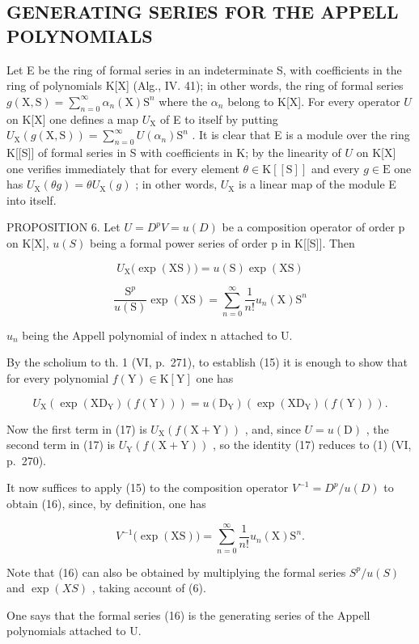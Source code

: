 \subsection{GENERATING SERIES FOR THE APPELL POLYNOMIALS}

Let E be the ring of formal series in an indeterminate S, with coefficients in the ring of polynomials K{[}X{]} (Alg., IV. 41); in other words, the ring of formal series \(g(\mathrm{X}, \mathrm{S}) = \sum_{n=0}^{\infty} \alpha_n(\mathrm{X}) \mathrm{S}^n\) where the \(\alpha_n\) belong to K{[}X{]}. For every operator \(U\) on K{[}X{]} one defines a map \(U_{\mathrm{X}}\) of E to itself by putting \(U_{\mathrm{X}}(g(\mathrm{X}, \mathrm{S})) = \sum_{n=0}^{\infty} U(\alpha_n)\mathrm{S}^n\) . It is clear that E is a module over the ring K{[}{[}S{]}{]} of formal series in S with coefficients in K; by the linearity of \(U\) on K{[}X{]} one verifies immediately that for every element \(\theta \in \mathrm{K}[[\mathrm{S}]]\) and every \(g \in \mathrm{E}\) one has \(U_{\mathrm{X}}(\theta g) = \theta U_{\mathrm{X}}(g)\) ; in other words, \(U_{\mathrm{X}}\) is a linear map of the module E into itself.

PROPOSITION 6. Let \(U = D^{p}V = u(D)\) be a composition operator of order p on K{[}X{]}, \(u(S)\) being a formal power series of order p in K{[}{[}S{]}{]}. Then

\[
U _ {\mathrm{X}} \big (\exp (\mathrm{XS}) \big) = u (\mathrm{S}) \exp (\mathrm{XS})\tag{15}
\]

\[
\frac {\mathrm{S} ^ {p}}{u (\mathrm{S})} \exp (\mathrm{XS}) = \sum_ {n = 0} ^ {\infty} \frac {1}{n !} u _ {n} (\mathrm{X}) \mathrm{S} ^ {n}\tag{16}
\]

\(u_{n}\) being the Appell polynomial of index n attached to U.

By the scholium to th. 1 (VI, p.~271), to establish (15) it is enough to show that for every polynomial \(f(\mathrm{Y}) \in \mathrm{K}[\mathrm{Y}]\) one has

\[
U _ {\mathrm{X}} \left(\exp (\mathrm{XD} _ {\mathrm{Y}}) (f (\mathrm{Y}))\right) = u (\mathrm{D} _ {\mathrm{Y}}) \left(\exp (\mathrm{XD} _ {\mathrm{Y}}) (f (\mathrm{Y}))\right).\tag{17}
\]

Now the first term in (17) is \(U_{\mathrm{X}}(f(\mathrm{X} + \mathrm{Y}))\) , and, since \(U = u(\mathrm{D})\) , the second term in (17) is \(U_{\mathrm{Y}}(f(\mathrm{X} + \mathrm{Y}))\) , so the identity (17) reduces to (1) (VI, p.~270).

It now suffices to apply (15) to the composition operator \(V^{-1} = D^{p}/u(D)\) to obtain (16), since, by definition, one has

\[
V ^ {- 1} \big (\exp (\mathrm{XS}) \big) = \sum_ {n = 0} ^ {\infty} \frac {1}{n !} u _ {n} (\mathrm{X}) \mathrm{S} ^ {n}.
\]

Note that (16) can also be obtained by multiplying the formal series \(S^{p}/u(S)\) and \(\exp(XS)\) , taking account of (6).

One says that the formal series (16) is the generating series of the Appell polynomials attached to U.

